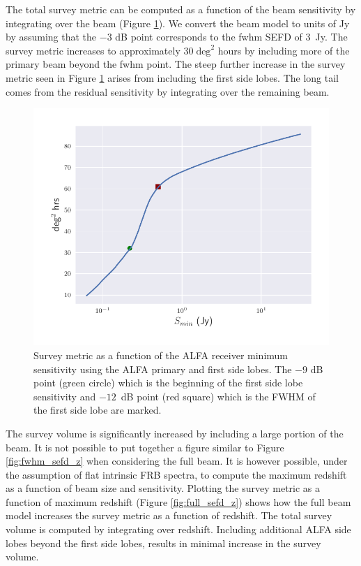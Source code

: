 \documentclass[a4paper,fleqn,usenatbib]{mnras}
\begin{document}
The total survey metric can be computed as a function of the beam sensitivity by
integrating over the beam (Figure \ref{fig:survey_metric_sense}). We convert the
beam model to units of Jy by assuming that the $-3$ dB point corresponds to the
\gls{fwhm} SEFD of 3~Jy. The survey metric increases to approximately $30 \;
\textrm{deg}^2$ hours by including more of the primary beam beyond the
\gls{fwhm} point. The steep further increase in the survey metric seen in Figure
\ref{fig:survey_metric_sense} arises from including the first side lobes. The
long tail comes from the residual sensitivity by integrating over the remaining
beam.

\begin{figure}
    \includegraphics[width=1.0\linewidth]{figures/full_survey_metric_sense.pdf}
    \caption{Survey metric as a function of the ALFA receiver minimum
    sensitivity using the ALFA primary and first side lobes. The $-9$ dB point
    (green circle) which is the beginning of the first side lobe sensitivity and
    $-12$~dB point (red square) which is the FWHM of the first side lobe are
    marked.
    }
    \label{fig:survey_metric_sense}
\end{figure}

The survey volume is significantly increased by including a large portion of the
beam. It is not possible to put together a figure similar to Figure
\ref{fig:fwhm_sefd_z} when considering the full beam. It is however possible,
under the assumption of flat intrinsic FRB spectra, to compute the maximum
redshift as a function of beam size and sensitivity. Plotting the survey metric
as a function of maximum redshift (Figure \ref{fig:full_sefd_z}) shows how the
full beam model increases the survey metric as a function of redshift. The total
survey volume is computed by integrating over redshift.  Including additional
ALFA side lobes beyond the first side lobes, results in minimal increase in the
survey volume.
\end{document}
